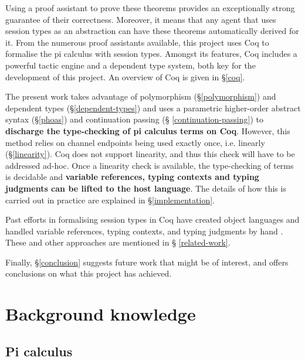 \documentclass{mproj}
\begin{document}
Using a proof assistant to prove these theorems provides an exceptionally strong
guarantee of their correctness. Moreover, it means that any agent that uses
session types as an abstraction can have these theorems automatically derived
for it. From the numerous proof assistants available, this project uses Coq to
formalise the pi calculus with session types. Amongst its features, Coq includes
a powerful tactic engine and a dependent type system, both key for the
development of this project. An overview of Coq is given in \S \ref{coq}.

The present work takes advantage of polymorphism (\S \ref{polymorphism}) and
dependent types (\S \ref{dependent-types}) and uses a parametric higher-order
abstract syntax (\S \ref{phoas}) and continuation passing (\S
\ref{continuation-passing}) to \textbf{discharge the type-checking of pi
calculus terms on Coq}. However, this method relies on channel endpoints being
used exactly once, i.e. linearly (\S \ref{linearity}). Coq does not support
linearity, and thus this check will have to be addressed ad-hoc. Once a
linearity check is available, the type-checking of terms is decidable and
\textbf{variable references, typing contexts and typing judgments can be lifted
to the host language}. The details of how this is carried out in practice are
explained in \S \ref{implementation}.

Past efforts in formalising session types in Coq have created object languages
and handled variable references, typing contexts, and typing judgments by hand
\cite{Dilmore2019}. These and other approaches are mentioned in \S
\ref{related-work}.

Finally, \S \ref{conclusion} suggests future work that might be of interest, and
offers conclusions on what this project has achieved.

\chapter{Background knowledge}

\section{Pi calculus}\label{pi-calculus}
\end{document}
